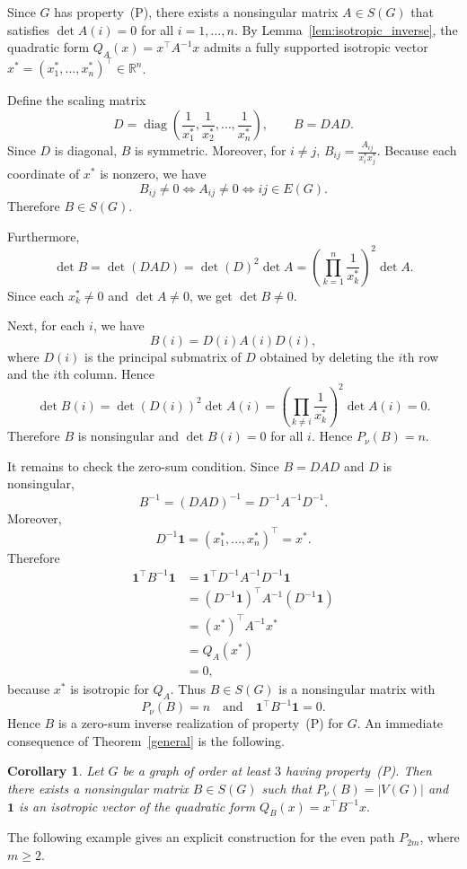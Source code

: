 \documentclass[12pt,reqno]{amsart}
\newtheorem{cor}[thm]{Corollary}
\theoremstyle{definition}
\numberwithin{equation}{subsection}
\newenvironment{pf}{\proof}{\endproof}
\numberwithin{equation}{section}
\def\det{\operatorname{det}}
\begin{document}
\begin{pf}
Since $G$ has property~(P), there exists a nonsingular matrix $A \in S(G)$ that satisfies $\det A(i)=0$ for all $i=1,\dots,n$. By Lemma~\ref{lem:isotropic_inverse}, the quadratic form $Q_A(x) = x^\top A^{-1} x$ admits a fully supported isotropic vector $x^\ast = (x_1^\ast, \dots, x_n^\ast)^\top \in \mathbb{R}^n$.

Define the scaling matrix
\[
D=\operatorname{diag}\left(
\frac{1}{x_1^\ast},\frac{1}{x_2^\ast},\dots,\frac{1}{x_n^\ast}
\right),
\qquad
B=DAD.
\]
Since $D$ is diagonal, $B$ is symmetric. Moreover, for $i\neq j$,
\(
B_{ij}
=
\frac{A_{ij}}{x_i^\ast x_j^\ast}.
\)
Because each coordinate of $x^\ast$ is nonzero, we have
\[
B_{ij}\neq 0
\iff
A_{ij}\neq 0
\iff
ij\in E(G).
\]
Therefore $B\in S(G)$.

Furthermore,
\[
\det B
=
\det(DAD)
=
\det(D)^2\det A
=
\left(\prod_{k=1}^n\frac{1}{x_k^\ast}\right)^2\det A.
\]
Since each $x_k^\ast\neq 0$ and $\det A\neq 0$, we get $\det B\neq 0$.

Next, for each $i$, we have
\[
B(i)=D(i)A(i)D(i),
\]
where $D(i)$ is the principal submatrix of $D$ obtained by deleting the $i$th
row and the $i$th column. Hence
\[
\det B(i)
=
\det(D(i))^2\det A(i)
=
\left(\prod_{k\neq i}\frac{1}{x_k^\ast}\right)^2\det A(i)
=
0.
\]
Therefore $B$ is nonsingular and $\det B(i)=0$ for all $i$. Hence
\(
P_\nu(B)=n.
\)

It remains to check the zero-sum condition. Since $B=DAD$ and $D$ is
nonsingular,
\[
B^{-1}=(DAD)^{-1}=D^{-1}A^{-1}D^{-1}.
\]
Moreover,
\[
D^{-1}\mathbf 1
=
(x_1^\ast,\dots,x_n^\ast)^\top
=
x^\ast.
\]
Therefore
\[
\begin{aligned}
\mathbf 1^\top B^{-1}\mathbf 1
&=
\mathbf 1^\top D^{-1}A^{-1}D^{-1}\mathbf 1 \\
&=
(D^{-1}\mathbf 1)^\top A^{-1}(D^{-1}\mathbf 1) \\
&=
(x^*)^\top A^{-1} x^*\\
&=
Q_A(x^\ast) \\
&=
0,
\end{aligned}
\]
because $x^\ast$ is isotropic for $Q_A$.
Thus $B\in S(G)$ is a nonsingular matrix with
\[
P_\nu(B)=n
\quad\text{and}\quad
\mathbf{1}^\top B^{-1}\mathbf{1}=0.
\]
Hence $B$ is a zero-sum inverse realization of property~(P) for $G$.
\end{pf}
An immediate consequence of Theorem~\ref{general} is the following.
\begin{cor}
Let $G$ be a graph of order at least $3$ having property~(P).
Then there exists a nonsingular matrix $B\in S(G)$ such that
\(
P_\nu(B)=|V(G)|
\)
and $\mathbf1$ is an isotropic vector of the quadratic form
\(
Q_B(x)=x^\top B^{-1}x.
\)
\end{cor}
The following example gives an explicit construction for the even path \(P_{2m}\), where \(m\ge2\).
\end{document}

